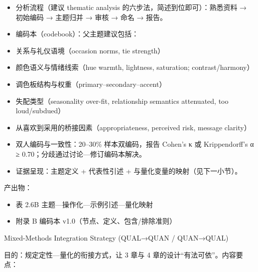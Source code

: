 \begin{itemize}

  \item 分析流程（建议 thematic analysis 的六步法，简述到位即可）：熟悉资料 → 初始编码 → 主题归并 → 审核 → 命名 → 报告。

  \item 编码本（codebook）：父主题建议包括：

  \item 关系与礼仪语境（occasion norms, tie strength）

  \item 颜色语义与情绪线索（hue warmth, lightness, saturation; contrast/harmony）

  \item 调色板结构与权重（primary–secondary–accent）

  \item 失配类型（seasonality over-fit, relationship semantics attenuated, too loud/subdued）

  \item 从喜欢到采用的桥接因素（appropriateness, perceived risk, message clarity）

  \item 双人编码与一致性：20–30\% 样本双编码，报告 Cohen’s κ 或 Krippendorff’s α ≥ 0.70；分歧通过讨论—修订编码本解决。

  \item 证据呈现：主题定义 + 代表性引述 + 与量化变量的映射（见下一小节）。

\end{itemize}

产出物：

\begin{itemize}

  \item 表 2.6B 主题—操作化—示例引述—量化映射

  \item 附录 B 编码本 v1.0（节点、定义、包含/排除准则）

\end{itemize}

Mixed-Methods Integration Strategy (QUAL→QUAN / QUAN→QUAL)

目的：规定定性—量化的衔接方式，让 3 章与 4 章的设计“有法可依”。内容要点：

